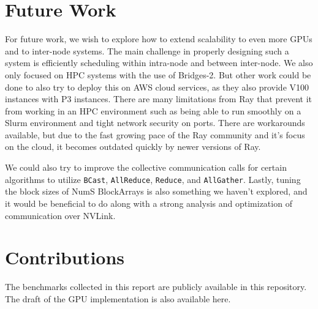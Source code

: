 \documentclass{article}
\begin{document}
\section{Future Work}
For future work, we wish to explore how to extend scalability to even more GPUs and to inter-node systems. The main challenge in properly designing such a system is efficiently scheduling within intra-node and between inter-node. We also only focused on HPC systems with the use of Bridges-2. But other work could be done to also try to deploy this on AWS cloud services, as they also provide V100 instances with P3 instances. There are many limitations from Ray that prevent it from working in an HPC environment such as being able to run smoothly on a Slurm environment and tight network security on ports. There are workarounds available, but due to the fast growing pace of the Ray community and it's focus on the cloud, it becomes outdated quickly by newer versions of Ray. 

We could also try to improve the collective communication calls for certain algorithms to utilize \verb|BCast|, \verb|AllReduce|, \verb|Reduce|, and \verb|AllGather|. Lastly, tuning the block sizes of NumS BlockArrays is also something we haven't explored, and it would be beneficial to do along with a strong analysis and optimization of communication over NVLink.

\section{Contributions}
The benchmarks collected in this report are publicly available in this repository. \cite{benchmarks} The draft of the GPU implementation is also available here. \cite{nums-pr}


 
\end{document}
